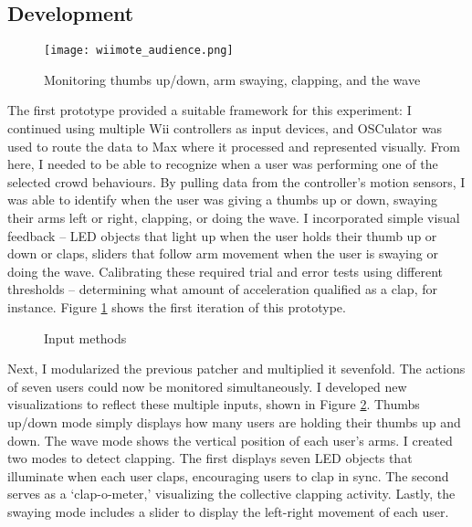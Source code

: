 \subsection{Development}

\begin{figure}
	\centering

	\texttt{[image: wiimote\_audience.png]}
	\caption{Monitoring thumbs up/down, arm swaying, clapping, and the wave}

	\label{prototyping2.1}
\end{figure}

The first prototype provided a suitable framework for this experiment: I continued using multiple Wii controllers as input devices, and OSCulator was used to route the data to Max where it processed and represented visually. From here, I needed to be able to recognize when a user was performing one of the selected crowd behaviours. By pulling data from the controller's motion sensors, I was able to identify when the user was giving a thumbs up or down, swaying their arms left or right, clapping, or doing the wave. I incorporated simple visual feedback -- LED objects that light up when the user holds their thumb up or down or claps, sliders that follow arm movement when the user is swaying or doing the wave. Calibrating these required trial and error tests using different thresholds -- determining what amount of acceleration qualified as a clap, for instance. Figure \ref{prototyping2.1} shows the first iteration of this prototype.

\begin{figure}[p]		%
	\centering

	\hspace{0.1cm}
	\hspace{0.1cm}
	\hspace{0.1cm}
	\hspace{0.1cm}

	\caption{Input methods}

	\label{prototyping2.2}
\end{figure}

Next, I modularized the previous patcher and multiplied it sevenfold. The actions of seven users could now be monitored simultaneously. I developed new visualizations to reflect these multiple inputs, shown in Figure \ref{prototyping2.2}. Thumbs up/down mode simply displays how many users are holding their thumbs up and down. The wave mode shows the vertical position of each user's arms. I created two modes to detect clapping. The first displays seven LED objects that illuminate when each user claps, encouraging users to clap in sync. The second serves as a `clap-o-meter,' visualizing the collective clapping activity. Lastly, the swaying mode includes a slider to display the left-right movement of each user.

